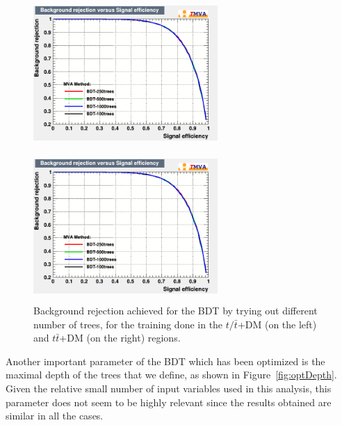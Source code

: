 \documentclass[a4paper, 10pt, openright]{report}
\begin{document}
\begin{appendices}
\begin{figure}[htbp]
\centering
\begin{minipage}[b]{.48\textwidth}
\includegraphics[width=7cm, height=5.7cm]{figs/BDT_trees_ST.png}
\end{minipage}\hfill
\begin{minipage}[b]{.48\textwidth}
\includegraphics[width=7cm, height=5.7cm]{figs/BDT_trees_TTbar.png}
\end{minipage} \hfill
\caption{Background rejection achieved for the \ac{BDT} by trying out different number of trees, for the training done in the $t/ \bar t$+DM (on the left) and $t \bar t$+DM (on the right) regions.}
\label{fig:optTrees}
\end{figure}

Another important parameter of the \ac{BDT} which has been optimized is the maximal depth of the trees that we define, as shown in Figure~\ref{fig:optDepth}. Given the relative small number of input variables used in this analysis, this parameter does not seem to be highly relevant since the results obtained are similar in all the cases.


\end{appendices}
\end{document}
